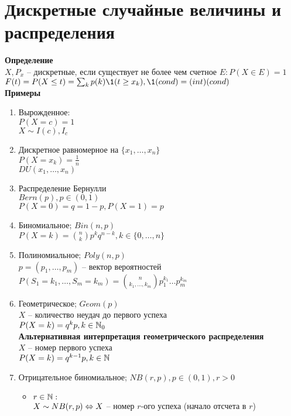\documentclass[12pt]{article}
\begin{document}
\section{Дискретные случайные величины и распределения}
\textbf{Определение}\\
$X, P_x$ -- дискретные, если существует не более чем счетное $E: P(X \in E) = 1$\\
$F(t) = P(X \leq t) = \sum_k p(k) \1(t \geq x_k), \1(cond) = (int)(cond)$\\
\textbf{Примеры}
\begin{enumerate}
    \item Вырожденное:\\
    $P(X=c) = 1$\\
    $X \sim I(c), I_c$
    \item Дискретное равномерное на $\{x_1, \ldots, x_n\}$\\
    $P(X = x_k) = \frac1n$\\
    $DU(x_1, \ldots, x_n)$
    \item Распределение Бернулли\\
    $Bern(p), p \in (0, 1)$\\
    $P(X = 0) = q = 1-p, P(X = 1) = p$
    \item Биномиальное; $Bin(n, p)$\\
    $P(X = k) = \binom{n}{k} p^k q^{n-k}, k \in \{0, \ldots, n\}$
    \item Полиномиальное; $Poly(n, p)$\\
    $p=(p_1, \ldots, p_m)$ -- вектор вероятностей\\
    $P(S_1 = k_1, \ldots, S_m = k_m) = \binom{n}{k_1, \ldots, k_m} p_1^{k_1}\ldots p_m^{k_m}$
    \item Геометрическое; $Geom(p)$\\
    $X$ -- количество неудач до первого успеха\\
    $P(X = k) = q^k p, k \in \mathbb{N}_0$\\
    \textbf{Альтернативная интерпретация геометрического распределения}\\
    $X$ -- номер первого успеха\\
    $P(X=k)=q^{k-1}p, k \in \mathbb{N}$
    \item Отрицательное биномиальное; $NB(r, p), p \in (0, 1), r > 0$
    \begin{itemize}
        \item $r \in \mathbb{N}:$\\
        $X \sim NB(r, p) \Leftrightarrow X$ -- номер $r$-ого успеха (начало отсчета в $r$)\\

\end{itemize}
\end{enumerate}
\end{document}
